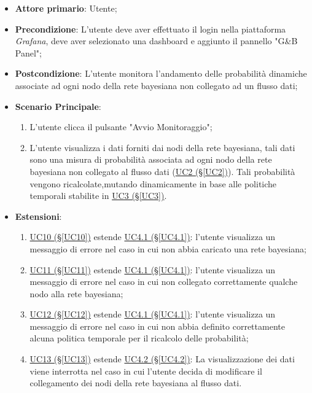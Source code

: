 \begin{itemize}
\item \textbf{Attore primario}: Utente;
\item \textbf{Precondizione}: L'utente deve aver effettuato il login nella piattaforma \textit{Grafana}, deve aver selezionato una dashboard e aggiunto il pannello "G\&B Panel";
\item \textbf{Postcondizione}: L'utente monitora l'andamento delle probabilità dinamiche associate ad ogni nodo della rete bayesiana non collegato ad un flusso dati;
\item \textbf{Scenario Principale}: 
	\begin{enumerate}
	\item L'utente clicca il pulsante "Avvio Monitoraggio";
	\item L'utente visualizza i dati forniti dai nodi della rete bayesiana, tali dati sono una misura di probabilità 			associata ad ogni nodo della rete bayesiana non collegato al flusso dati (\hyperref[UC2]{UC2 (§\ref*{UC2})}). 				Tali probabilità vengono ricalcolate,mutando dinamicamente in base alle politiche temporali stabilite in 						\hyperref[UC3]{UC3 (§\ref*{UC3})}.
	\end{enumerate}
\item \textbf{Estensioni}:
	\begin{enumerate}
	\item \hyperref[UC10]{UC10 (§\ref*{UC10})} estende \hyperref[UC4.1]{UC4.1 (§\ref*{UC4.1})}: l'utente visualizza 				un messaggio di errore nel caso in cui non abbia caricato una rete bayesiana;
	\item \hyperref[UC11]{UC11 (§\ref*{UC11})} estende \hyperref[UC4.1]{UC4.1 (§\ref*{UC4.1})}: l'utente visualizza 				un messaggio di errore nel caso in cui non collegato correttamente qualche nodo alla rete bayesiana;
	\item \hyperref[UC12]{UC12 (§\ref*{UC12})} estende \hyperref[UC4.1]{UC4.1 (§\ref*{UC4.1})}: l'utente visualizza 				un messaggio di errore nel caso in cui non abbia definito correttamente alcuna politica temporale per il 						ricalcolo delle probabilità;
	\item \hyperref[UC13]{UC13 (§\ref*{UC13})} estende \hyperref[UC4.2]{UC4.2 (§\ref*{UC4.2})}: La visualizzazione 				dei dati viene interrotta nel caso in cui l'utente decida di modificare il collegamento dei nodi della rete 					bayesiana al flusso dati.
	\end{enumerate}
\end{itemize}

